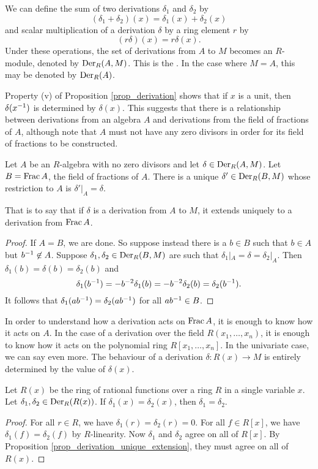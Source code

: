 We can define the sum of two derivations $\delta_1$ and $\delta_2$ by
  \[ (\delta_1 + \delta_2)(x) = \delta_1(x) + \delta_2(x) \]
and scalar multiplication of a derivation $\delta$ by a ring element $r$ by
  \[ (r\delta)(x) = r\delta(x). \]
Under these operations, the set of derivations from $A$ to $M$ becomes an $R$-module,
denoted by $\operatorname{Der}_R(A,M)$.
This is the .
In the case where $M = A$, this may be denoted by $\operatorname{Der}_R(A)$.

Property (v) of Proposition \ref{prop_derivation} shows that if $x$ is a unit,
then $\delta(x^{-1})$ is determined by $\delta(x)$.
This suggests that there is a relationship between derivations from an algebra $A$
and derivations from the field of fractions of $A$,
although note that $A$ must not have any zero divisors in order for its field of fractions to be constructed.

\begin{proposition}
  \label{prop_derivation_unique_extension}
  Let $A$ be an $R$-algebra with no zero divisors and let $\delta \in \operatorname{Der}_R(A,M)$.
  Let $B = \operatorname{Frac} A$, the field of fractions of $A$.
  There is a unique $\delta' \in \operatorname{Der}_R(B, M)$ whose restriction to $A$ is $\delta'|_A = \delta$.
\end{proposition}
That is to say that if $\delta$ is a derivation from $A$ to $M$,
it extends uniquely to a derivation from $\operatorname{Frac} A$.
\begin{proof}
  If $A = B$, we are done.
  So suppose instead there is a $b \in B$ such that $b\in A$ but $b^{-1} \not \in A$.
  Suppose $\delta_1, \delta_2 \in \operatorname{Der}_R(B, M)$ are such that $\delta_1|_{A} = \delta = \delta_2|_{A}$.
  Then $\delta_1(b) = \delta(b) = \delta_2(b)$ and
    \[ \delta_1(b^{-1}) = -b^{-2}\delta_1(b) = -b^{-2}\delta_2(b) = \delta_2(b^{-1}). \]
  It follows that $\delta_1(ab^{-1}) = \delta_2(ab^{-1})$ for all $ab^{-1} \in B$.
\end{proof}

In order to understand how a derivation acts on $\operatorname{Frac} A$, it is enough to know how it acts on $A$.
In the case of a derivation over the field $R(x_1, \ldots, x_n)$,
it is enough to know how it acts on the polynomial ring $R[x_1, \ldots, x_n]$.
In the univariate case, we can say even more.
The behaviour of a derivation $\delta: R(x) \to M$ is entirely determined by the value of $\delta(x)$.

\begin{proposition}
  \label{prop_derivation_unique_x}
  Let $R(x)$ be the ring of rational functions over a ring $R$ in a single variable $x$.
  Let $\delta_1, \delta_2 \in \operatorname{Der}_R(R(x))$.
  If $\delta_1(x) = \delta_2(x)$, then $\delta_1 = \delta_2$.
\end{proposition}
\begin{proof}
  For all $r \in R$, we have $\delta_1(r) = \delta_2(r) = 0$.
  For all $f \in R[x]$, we have $\delta_1(f) = \delta_2(f)$ by $R$-linearity.
  Now $\delta_1$ and $\delta_2$ agree on all of $R[x]$.
  By Proposition \ref{prop_derivation_unique_extension}, they must agree on all of $R(x)$.
\end{proof}

